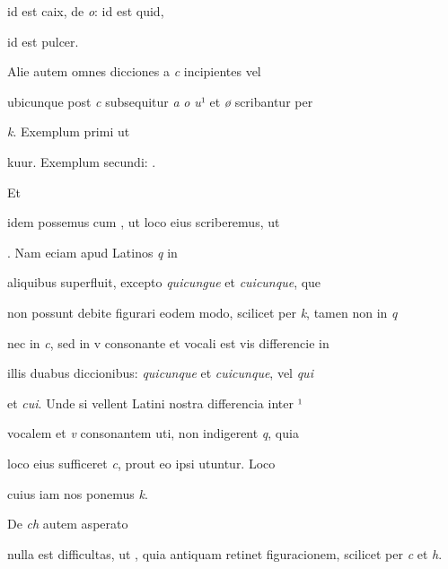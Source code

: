    id est caix, de \textit{o}:  id est quid, 

\splitlines

id est pulcer.

\indentK Alie autem omnes dicciones a \textit{c} incipientes vel

\fulllines

ubicunque post \textit{c} subsequitur \textit{a} \textit{o} \textit{u}¹ et \textit{ø} scribantur per

\textit{k}. Exemplum primi ut     

\splitlines

kuur. Exemplum secundi:    .

\indentK Et

\fulllines

idem possemus cum , ut loco eius  scriberemus, ut 

  . Nam eciam apud Latinos \textit{q} in

 aliquibus superfluit, excepto \textit{quicungue} et \textit{cuicunque}, que 

non possunt debite figurari eodem modo, scilicet per \textit{k}, tamen non in \textit{q}

nec in \textit{c}, sed in v consonante et vocali est vis differencie in

illis duabus diccionibus: \textit{quicunque} et \textit{cuicunque}, vel \textit{qui}

et \textit{cui}. Unde si vellent Latini nostra differencia inter ¹

vocalem et \textit{v} consonantem uti, non indigerent \textit{q}, quia

loco eius sufficeret \textit{c}, prout eo ipsi utuntur. Loco

\splitlines

cuius iam nos ponemus \textit{k}.

\indentK De \textit{ch} autem asperato

\fulllines

nulla est difficultas, ut   
, quia antiquam retinet figuracionem, scilicet per \textit{c} et \textit{h}.


